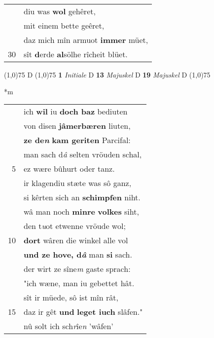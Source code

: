 \documentclass[8pt,a4paper,notitlepage]{article}
\begin{document}
\begin{table}[ht]
\begin{minipage}[t]{0.5\linewidth}
\begin{tabular}{rl}
 & diu was \textbf{wol} gehêret,\\ 
 & mit einem bette geêret,\\ 
 & daz mich mîn armuot \textbf{immer} müet,\\ 
30 & sît \textbf{d}erde \textbf{al}sölhe rîcheit blüet.\\ 
\end{tabular}
\scriptsize
\line(1,0){75} \newline
D \newline
\line(1,0){75} \newline
\textbf{1} \textit{Initiale} D  \textbf{13} \textit{Majuskel} D  \textbf{19} \textit{Majuskel} D  \newline
\line(1,0){75} \newline
\newline
\end{minipage}
\hspace{0.5cm}
\begin{minipage}[t]{0.5\linewidth}
\small
\begin{center}*m
\end{center}
\begin{tabular}{rl}
 & ich \textbf{wil} iu \textbf{doch baz} bediuten\\ 
 & von disen \textbf{jâmerbæren} liuten,\\ 
 & \textbf{ze de\textit{n}} \textbf{kam geriten} Parcifal:\\ 
 & man sach d\textit{â} selten vröuden schal,\\ 
5 & ez wære bûhurt oder tanz.\\ 
 & ir klagendiu stæte was sô ganz,\\ 
 & si kêrten sich an \textbf{schimpfen} niht.\\ 
 & wâ man noch \textbf{minre} \textbf{volkes} siht,\\ 
 & den t\textit{u}ot etwenne vröude wol;\\ 
10 & \textbf{dort} wâren die winkel alle vol\\ 
 & \textbf{und ze hove, d\textit{â}} man \textbf{si} sach.\\ 
 & der wirt ze sîne\textit{m} gaste sprach:\\ 
 & "ich wæne, man iu gebettet hât.\\ 
 & sît ir müede, sô ist mîn rât,\\ 
15 & daz ir gêt \textbf{und} \textbf{leget iuch} slâfen."\\ 
 & nû solt ich sch\textit{r}îe\textit{n} 'wâfen'\\ 

\end{tabular}
\end{minipage}
\end{table}
\end{document}
